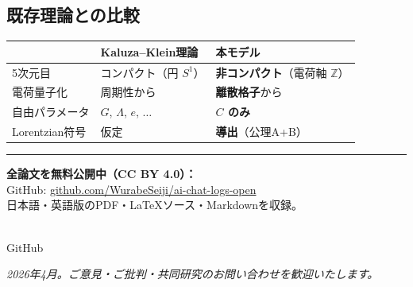 \documentclass[11pt,a4paper]{ltjsarticle}
\begin{document}
\subsection*{既存理論との比較}

\vspace{-2pt}
\begin{center}
\begin{tabular}{lll}
\toprule
& \textbf{Kaluza--Klein理論} & \textbf{本モデル} \\
\midrule
5次元目 & コンパクト（円 $S^1$） & \textbf{非コンパクト}（電荷軸 $\mathbb{Z}$） \\
電荷量子化 & 周期性から & \textbf{離散格子}から \\
自由パラメータ & $G$, $\Lambda$, $e$, $\ldots$ & \textbf{$C$ のみ} \\
Lorentzian符号 & 仮定 & \textbf{導出}（公理A+B） \\
\bottomrule
\end{tabular}
\end{center}

\vspace{12pt}
\hrule
\vspace{8pt}

\begin{center}
\begin{minipage}[c]{0.6\textwidth}
\small
\textbf{全論文を無料公開中（CC BY 4.0）：}\\
GitHub: \href{https://github.com/WurabeSeiji/ai-chat-logs-open}{github.com/WurabeSeiji/ai-chat-logs-open}\\
日本語・英語版のPDF・\LaTeX ソース・Markdownを収録。
\end{minipage}%
\hfill
\begin{minipage}[c]{0.15\textwidth}
\centering
{}\\[2pt]
{\scriptsize GitHub}
\end{minipage}
\end{center}

\vspace{6pt}
{\small\textit{2026年4月。ご意見・ご批判・共同研究のお問い合わせを歓迎いたします。}}
\end{document}
